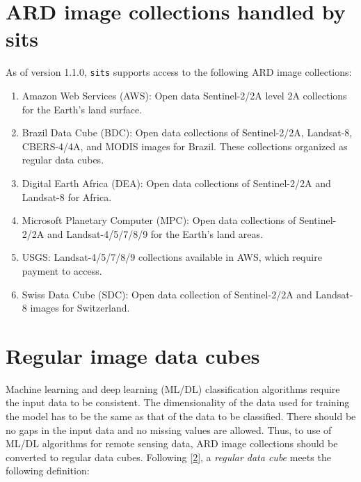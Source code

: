\documentclass[
  11pt,
]{report}
\newcommand{\passthrough}[1]{#1}
\providecommand{\tightlist}{%
  \setlength{\itemsep}{0pt}\setlength{\parskip}{0pt}}
\begin{document}
\hypertarget{ard-image-collections-handled-by-sits}{%
\section*{ARD image collections handled by
sits}\label{ard-image-collections-handled-by-sits}}

As of version 1.1.0, \passthrough{\lstinline!sits!} supports access to
the following ARD image collections:

\begin{enumerate}
\def\labelenumi{\arabic{enumi}.}
\tightlist
\item
  Amazon Web Services (AWS): Open data Sentinel-2/2A level 2A
  collections for the Earth's land surface.
\item
  Brazil Data Cube (BDC): Open data collections of Sentinel-2/2A,
  Landsat-8, CBERS-4/4A, and MODIS images for Brazil. These collections
  organized as regular data cubes.
\item
  Digital Earth Africa (DEA): Open data collections of Sentinel-2/2A and
  Landsat-8 for Africa.
\item
  Microsoft Planetary Computer (MPC): Open data collections of
  Sentinel-2/2A and Landsat-4/5/7/8/9 for the Earth's land areas.
\item
  USGS: Landsat-4/5/7/8/9 collections available in AWS, which require
  payment to access.
\item
  Swiss Data Cube (SDC): Open data collection of Sentinel-2/2A and
  Landsat-8 images for Switzerland.
\end{enumerate}

\hypertarget{regular-image-data-cubes}{%
\section*{Regular image data cubes}\label{regular-image-data-cubes}}

Machine learning and deep learning (ML/DL) classification algorithms
require the input data to be consistent. The dimensionality of the data
used for training the model has to be the same as that of the data to be
classified. There should be no gaps in the input data and no missing
values are allowed. Thus, to use of ML/DL algorithms for remote sensing
data, ARD image collections should be converted to regular data cubes.
Following \protect\hyperlink{ref-Appel2019}{{[}2{]}}, a \emph{regular
data cube} meets the following definition:
\end{document}
